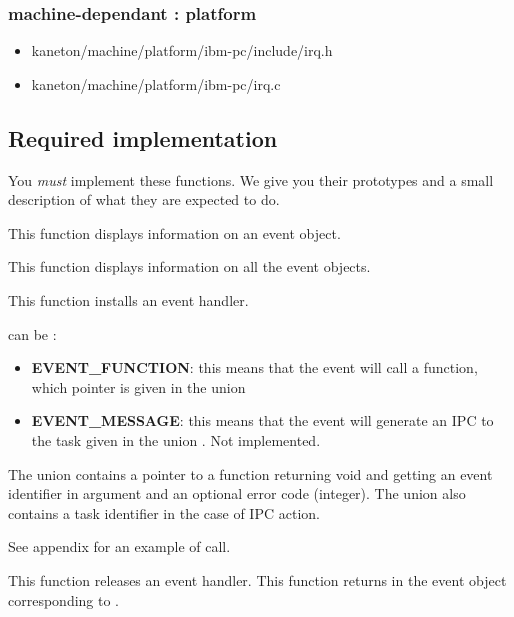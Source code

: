 \subsubsection{\color{filerefcolor} machine-dependant : platform}
\begin{itemize}
\item kaneton/machine/platform/ibm-pc/include/irq.h
\item kaneton/machine/platform/ibm-pc/irq.c
\end{itemize}

\subsection*{Required implementation}
You \textit{must} implement these functions. We give you their prototypes
and a small description of what they are expected to do.

	 {
	   This function displays information on an event object.
	 }

	 {
	   This function displays information on all the event objects.
	 }

	 {
	   This function installs an event handler.

	    can be :
	   \begin{itemize}
	     \item
	       \textbf{EVENT\_FUNCTION}: this means that the event will
	       call a function, which pointer is given in the union
	     \item
	       \textbf{EVENT\_MESSAGE}: this means that the event will
	       generate an IPC to the task given in the union
	       . Not implemented.
	   \end{itemize}

	   The union  contains a pointer to a
	   function returning void and getting an event identifier in
	   argument and an optional error code (integer). The union
	   also contains a task identifier in the case of IPC action.

	   See appendix for an example of call.
	 }

	 {
	   This function releases an event handler.
	 }
\newpage
{}
	 {
	   This function returns in  the event object
	   corresponding to .
	 }

